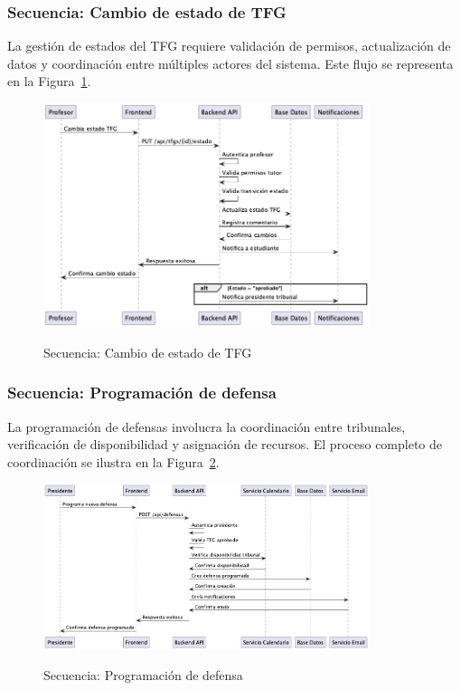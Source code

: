 \documentclass[12pt,a4paper,oneside]{report}
\providecommand{\pandocbounded}[1]{#1}
\begin{document}
\subsubsection{Secuencia: Cambio de estado de
TFG}\label{secuencia-cambio-de-estado-de-tfg}

La gestión de estados del TFG requiere validación de permisos, actualización de datos y coordinación entre múltiples actores del sistema. Este flujo se representa en la Figura~\ref{fig:secuencia-cambio-estado}.

\begin{figure}[H]
\centering
\pandocbounded{\includegraphics[keepaspectratio,width=0.85\textwidth,alt={Secuencia: Cambio de estado de TFG}]{processed/images/04_analisis_sistema_plantuml_2.png}}
\caption{Secuencia: Cambio de estado de TFG}
\label{fig:secuencia-cambio-estado}
\end{figure}

\subsubsection{Secuencia: Programación de
defensa}\label{secuencia-programaciuxf3n-de-defensa}

La programación de defensas involucra la coordinación entre tribunales, verificación de disponibilidad y asignación de recursos. El proceso completo de coordinación se ilustra en la Figura~\ref{fig:secuencia-programacion-defensa}.

\begin{figure}[H]
\centering
\pandocbounded{\includegraphics[keepaspectratio,width=0.85\textwidth,alt={Secuencia: Programación de defensa}]{processed/images/04_analisis_sistema_plantuml_3.png}}
\caption{Secuencia: Programación de defensa}
\label{fig:secuencia-programacion-defensa}
\end{figure}
\end{document}
